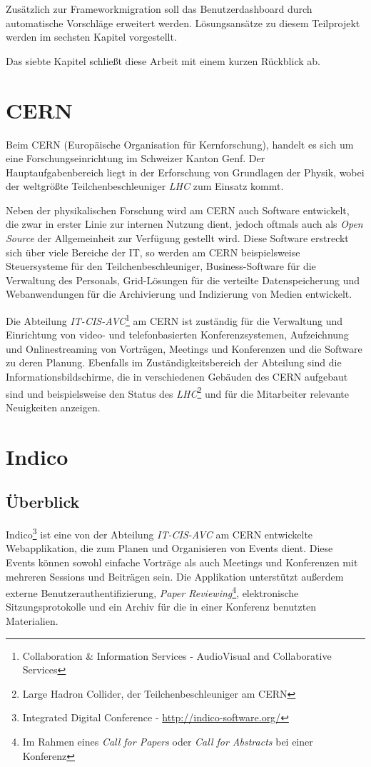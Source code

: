 Zusätzlich zur Frameworkmigration soll das Benutzerdashboard durch automatische Vorschläge erweitert
werden. Lösungsansätze zu diesem Teilprojekt werden im sechsten Kapitel vorgestellt.

Das siebte Kapitel schließt diese Arbeit mit einem kurzen Rückblick ab.


\section{CERN}

Beim CERN (Europäische Organisation für Kernforschung), handelt es sich um eine
Forschungseinrichtung im Schweizer Kanton Genf. Der Hauptaufgabenbereich liegt in der Erforschung
von Grundlagen der Physik, wobei der weltgrößte Teilchenbeschleuniger \emph{LHC} zum Einsatz kommt.

Neben der physikalischen Forschung wird am CERN auch Software entwickelt, die zwar in erster Linie
zur internen Nutzung dient, jedoch oftmals auch als \emph{Open Source} der Allgemeinheit zur Verfügung
gestellt wird. Diese Software erstreckt sich über viele Bereiche der IT, so werden am CERN
beispielsweise Steuersysteme für den Teilchenbeschleuniger, Business-Software für die Verwaltung des
Personals, Grid-Lösungen für die verteilte Datenspeicherung und Webanwendungen für die Archivierung
und Indizierung von Medien entwickelt.

Die Abteilung \emph{IT-CIS-AVC}\footnote{Collaboration \& Information Services - AudioVisual and
Collaborative Services} am CERN ist zuständig für die Verwaltung und Einrichtung von video- und
telefonbasierten Konferenzsystemen, Aufzeichnung und Onlinestreaming von Vorträgen, Meetings und
Konferenzen und die Software zu deren Planung. Ebenfalls im Zuständigkeitsbereich der Abteilung sind
die Informationsbildschirme, die in verschiedenen Gebäuden des CERN aufgebaut sind und beispielsweise
den Status des \emph{LHC}\footnote{Large Hadron Collider, der Teilchenbeschleuniger am CERN} und
für die Mitarbeiter relevante Neuigkeiten anzeigen.


\section{Indico}

\subsection{Überblick}
Indico\footnote{Integrated Digital Conference - \href{http://indico-software.org/}{http://indico-software.org/}}
ist eine von der Abteilung \emph{IT-CIS-AVC} am CERN entwickelte Webapplikation, die zum Planen und
Organisieren von Events dient. Diese Events können sowohl einfache Vorträge als auch Meetings und
Konferenzen mit mehreren Sessions und Beiträgen sein. Die Applikation unterstützt außerdem externe
Benutzerauthentifizierung, \emph{Paper Reviewing}\footnote{Im Rahmen eines \emph{Call for Papers}
oder \emph{Call for Abstracts} bei einer Konferenz}, elektronische Sitzungsprotokolle und ein Archiv
für die in einer Konferenz benutzten Materialien. \citep{indico}

